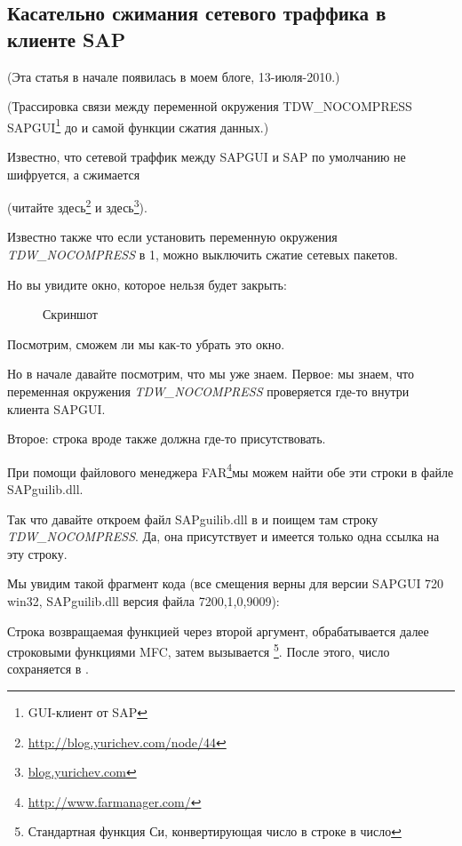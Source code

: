 \subsection{Касательно сжимания сетевого траффика в клиенте SAP}
\label{sec:SAPGUI}

(Эта статья в начале появилась в моем блоге, 13-июля-2010.)

\newcommand{\TDWNC}{TDW\_NOCOMPRESS\xspace}

(Трассировка связи между переменной окружения \TDWNC{} SAPGUI\footnote{GUI-клиент от SAP}
до  и самой функции сжатия данных.)

Известно, что сетевой траффик между SAPGUI и SAP по умолчанию не шифруется, а сжимается 

(читайте здесь\footnote{\url{http://blog.yurichev.com/node/44}} 
и здесь\footnote{\href{http://blog.yurichev.com/node/47}{blog.yurichev.com}}). 

Известно также что если установить переменную окружения \emph{\TDWNC} в 1, можно выключить сжатие сетевых пакетов.

Но вы увидите окно, которое нельзя будет закрыть:

\begin{figure}[H]
\centering
{}
\caption{Скриншот}
\end{figure}

Посмотрим, сможем ли мы как-то убрать это окно.

Но в начале давайте посмотрим, что мы уже знаем.
Первое: мы знаем, что переменная окружения \emph{\TDWNC} проверяется где-то внутри клиента SAPGUI.

Второе: строка вроде  также должна где-то присутствовать.

\newcommand{\FNURLFAR}{\footnote{\url{http://www.farmanager.com/}}}
При помощи файлового менеджера FAR\FNURLFAR мы можем найти обе эти строки в файле SAPguilib.dll.

Так что давайте откроем файл SAPguilib.dll в \IDA и поищем там строку \emph{\TDWNC}.
Да, она присутствует и имеется только одна ссылка на эту строку.

Мы увидим такой фрагмент кода
(все смещения верны для версии SAPGUI 720 win32, SAPguilib.dll версия файла 7200,1,0,9009):



Строка возвращаемая функцией  через второй аргумент, обрабатывается далее строковыми
функциями MFC, затем вызывается \footnote{Стандартная функция Си, конвертирующая число в строке в число}.
После этого, число сохраняется в .

